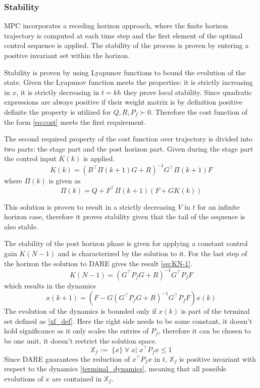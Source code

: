 \subsubsection*{Stability} \label{sec:stability}
MPC incorporates a receding horizon approach, where the finite horizon trajectory is computed at each time step and the first element of the optimal control sequence is applied. The stability of the process is proven by entering a positive invariant set  within the horizon.

Stability is proven by using Lyapunov functions to bound the evolution of the state. Given the Lyapunov function meets the properties: it is strictly increasing in $x$, it is strictly decreasing in $t = kh$ they prove local stability. Since quadratic expressions are always positive if their weight matrix is by definition positive definite the property is utilized for $Q,R,P_f \succ0$. Therefore the cost function of the form \autoref{eq:cost} meets the first requirement.

The second required property of the cost function over trajectory is divided into two parts: the stage part and the post horizon part. Given during the stage part the control input $K(k)$ is applied. 
\begin{equation}
    K(k) = (B^\top \Pi(k+1) G + R )^{-1} G^\top \Pi(k+1)F
\end{equation}
where $\Pi(k)$ is given as
\begin{equation}
    \Pi(k) = Q + F^\top \Pi(k+1) (F + G K(k))
\end{equation}

This solution is proven to result in a strictly decreasing $V$ in $t$ for an infinite horizon case, therefore it proves stability given that the tail of the sequence is also stable. 

The stability of the post horizon phase is given for applying a constant control gain $K(N-1)$ and is characterized by the solution to it. For the last step of the horizon the solution to DARE gives the result \autoref{eq:KN-1}.
\begin{equation} \label{eq:KN-1}
    K(N-1) = (G^\top P_f G+ R)^{-1}G^\top P_f F
\end{equation}
which results in the dynamics
\begin{equation} \label{terminal_dynamics}
    x(k+1) = \left(F-G (G^\top P_f G+ R)^{-1}G^\top P_f F\right) x(k)
\end{equation}
The evolution of the dynamics is bounded only if $x(k)$ is part of the terminal set defined as \autoref{xf_def}. Here the right side needs to be some constant, it doesn't hold significance as it only scales the entries of $P_f$, therefore it can be chosen to be one unit, it doesn't restrict the solution space. 
\begin{equation} \label{xf_def}
    \mathbb{X}_f:= \;\{x\} \;\forall \; x | \; x^\top P_f x \le 1
\end{equation}
Since DARE guarantees the reduction of $x^\top P_f x$ in $t$, $\mathbb{X}_f$ is positive invariant with respect to the dynamics \autoref{terminal_dynamics}, meaning that all possible evolutions of $x$ are contained in $\mathbb{X}_f$. 


